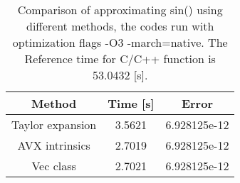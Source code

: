 \documentclass[10pt,a4paper]{article}
\theoremstyle{dotlessP}
\begin{document}
 	\begin{table}[tbhp] 
 	{\footnotesize
 		\caption{Comparison of approximating sin() using different methods, the codes run with optimization flags -O3 -march=native. The Reference time for C/C++ function is  53.0432 [s].
 		}\label{tab:Taylor}
 		\begin{center}
\begin{tabular}{|c|c|c|}
	\hline 
Method	& Time [s] &  Error\\ 
	\hline 
Taylor expansion	&  3.5621 & 6.928125e-12 \\ \hline 
AVX intrinsics &  2.7019 & 	6.928125e-12\\ \hline 
Vec class&  2.7021   & 	 6.928125e-12\\ \hline 
\end{tabular} 
 		\end{center}
 	}
 \end{table}
 
\end{document}
